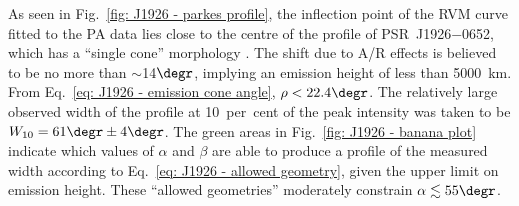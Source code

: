 As seen in Fig.~\ref{fig: J1926 - parkes profile}, the inflection point of the RVM curve fitted to the PA data lies close to the centre of the profile of PSR~J1926$-$0652, which has a ``single cone'' morphology \citep[][]{Rxxx1983a}. The shift due to A/R effects is believed to be no more than $\sim$14$\degr$, implying an emission height of less than 5000~km. From Eq.~\eqref{eq: J1926 - emission cone angle}, $\rho < 22.4\degr$. The relatively large observed width of the profile at 10~per~cent of the peak intensity was taken to be $W_{10} = 61\degr\pm 4\degr$. The green areas in Fig.~\ref{fig: J1926 - banana plot} indicate which values of $\alpha$ and $\beta$ are able to produce a profile of the measured width according to Eq.~\eqref{eq: J1926 - allowed geometry}, given the upper limit on emission height. These ``allowed geometries'' moderately constrain $\alpha \lesssim 55\degr$.





